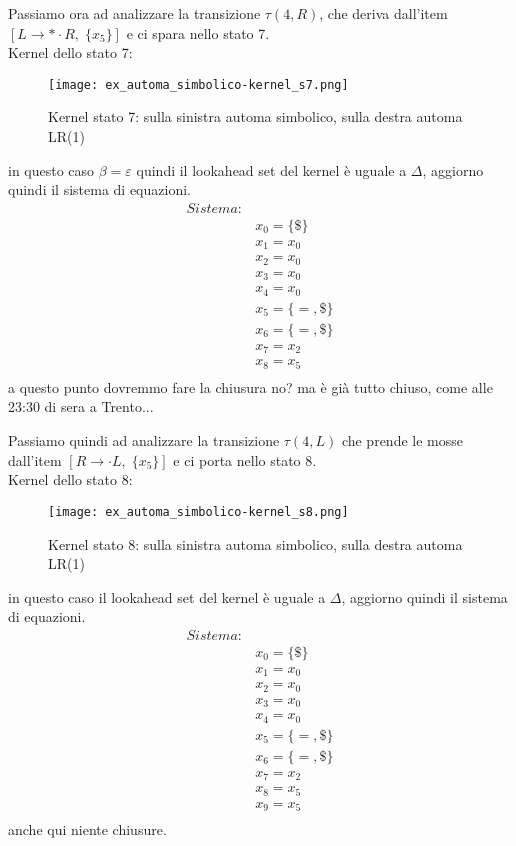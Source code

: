 \documentclass[class=book, crop=false, oneside, 12pt]{standalone}
\begin{document}
Passiamo ora ad analizzare la transizione \(\tau(4, R)\), che deriva dall'item \([L \to * \cdot R, \; \{x_5\}]\) e ci spara nello stato 7.
\\
Kernel dello stato 7:
\begin{figure}[h!]
    \centering
    \texttt{[image: ex\_automa\_simbolico-kernel\_s7.png]}
    \caption{Kernel stato 7: sulla sinistra automa simbolico, sulla destra automa LR(1)}
\end{figure}
in questo caso  \(\beta = \varepsilon\) quindi il lookahead set del kernel è uguale a \(\Delta\), aggiorno quindi il sistema di equazioni.
\begin{align*}
    Sistema:& \\
            & x_0 = \{\$\} \\
            & x_1 = x_0 \\
            & x_2 = x_0 \\
            & x_3 = x_0 \\
            & x_4 = x_0 \\
            & x_5 = \{=, \$\} \\
            & x_6 = \{=, \$\} \\
            & x_7 = x_2 \\
            & x_8 = x_5 \\
\end{align*}
a questo punto dovremmo fare la chiusura no? ma è già tutto chiuso, come alle 23:30 di sera a Trento...

Passiamo quindi ad analizzare la transizione \(\tau(4, L)\) che prende le mosse dall'item \([R \to \cdot L, \; \{x_5\}]\) e ci porta nello stato 8.
\\
Kernel dello stato 8:
\begin{figure}[h!]
    \centering
    \texttt{[image: ex\_automa\_simbolico-kernel\_s8.png]}
    \caption{Kernel stato 8: sulla sinistra automa simbolico, sulla destra automa LR(1)}
\end{figure}
in questo caso il lookahead set del kernel è uguale a \(\Delta\), aggiorno quindi il sistema di equazioni.
\begin{align*}
    Sistema:& \\
            & x_0 = \{\$\} \\
            & x_1 = x_0 \\
            & x_2 = x_0 \\
            & x_3 = x_0 \\
            & x_4 = x_0 \\
            & x_5 = \{=, \$\} \\
            & x_6 = \{=, \$\} \\
            & x_7 = x_2 \\
            & x_8 = x_5 \\
            & x_9 = x_5 \\
\end{align*}
anche qui niente chiusure.
\end{document}
